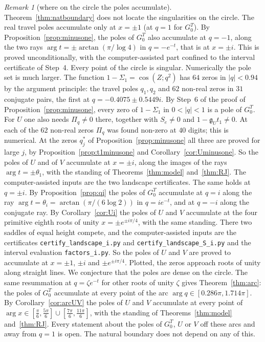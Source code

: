 \documentclass[11pt]{article}
\theoremstyle{plain}
\theoremstyle{definition}
\theoremstyle{remark}
\newtheorem{remark}[theorem]{Remark}
\theoremstyle{plain}\newtheorem*{maintheorem}{Main Theorem}
\begin{document}
\begin{remark}[where on the circle the poles accumulate]\label{rem:polesdensity}
Theorem~\ref{thm:natboundary} does not locate the singularities on the circle. The real travel
poles accumulate only at $x=\pm1$ (at $q=1$ for $G^T_0$). By Proposition~\ref{prop:minusone}, the
poles of $G^T_0$ also accumulate at $q=-1$, along the two rays $\arg t=\pm\arctan(\pi/\log4)$ in
$q=-e^{-t}$, that is at $x=\pm i$. This is proved unconditionally, with the computer-assisted part
confined to the interval certificate of Step~4. Every point of the circle is singular. Numerically
the pole set is much larger. The function $1-\Sigma_1=\cos(Z;q^2)$ has $64$ zeros in $|q|<0.94$ by
the argument principle: the travel poles $q_1,q_2$ and $62$ non-real zeros in $31$ conjugate pairs,
the first at $q=-0.4075\pm0.5449i$. By Step~6 of the proof of Proposition~\ref{prop:minusone}, every
zero of $1-\Sigma_1$ in $0<|q|<1$ is a pole of $G^T_0$. For $U$ one also needs $\Pi_q\ne0$
there, together with $S_e\ne0$ and $1-\mathfrak g_Ut_1\ne0$. At each of the $62$ non-real zeros
$\Pi_q$ was found non-zero at $40$ digits; this is numerical. At the zeros $q^\ast_j$ of
Proposition~\ref{prop:minusone} all three are proved for large $j$, by
Proposition~\ref{prop:t1minusone} and Corollary~\ref{cor:Uminusone}. So the poles of $U$ and of
$V$ accumulate at $x=\pm i$, along the images of the rays $\arg t=\pm\theta_1$, with the standing
of Theorems~\ref{thm:model} and~\ref{thm:RJ}. The computer-assisted inputs are the two landscape
certificates. The same holds at $q=\pm i$. By Proposition~\ref{prop:qi} the poles of $G^T_0$
accumulate at $q=i$ along the ray $\arg t=\theta_i=\arctan(\pi/(6\log2))$ in $q=ie^{-t}$, and at $q=-i$
along the conjugate ray. By Corollary~\ref{cor:Ui} the poles of $U$ and $V$ accumulate at the four
primitive eighth roots of unity $x=\pm e^{\pm i\pi/4}$, with the same standing. There two saddles of
equal height compete, and the computer-assisted inputs are the certificates
\texttt{certify\_landscape\_i.py} and \texttt{certify\_landscape\_S\_i.py} and the interval evaluation
\texttt{factors\_i.py}. So the poles of $U$ and $V$ are proved to accumulate at $x=\pm1$, $\pm i$ and
$\pm e^{\pm i\pi/4}$. Plotted, the zeros approach roots of unity along straight lines. We conjecture
that the poles are dense on the circle. The same resummation at $q=\zeta e^{-t}$ for other roots of
unity $\zeta$ gives Theorem~\ref{thm:arc}: the poles of $G^T_0$ accumulate at every point of the arc
$\arg q\in[0.286\pi,1.714\pi]$. By Corollary~\ref{cor:arcUV} the poles of $U$ and $V$ accumulate at
every point of $\arg x\in[\frac\pi6,\frac{5\pi}6]\cup[\frac{7\pi}6,\frac{11\pi}6]$, with the standing of
Theorems~\ref{thm:model} and~\ref{thm:RJ}. Every statement about the poles of $G^T_0$, $U$ or $V$ off these
arcs and away from $q=1$ is open. The natural boundary does not depend on
any of this.
\end{remark}
\end{document}
